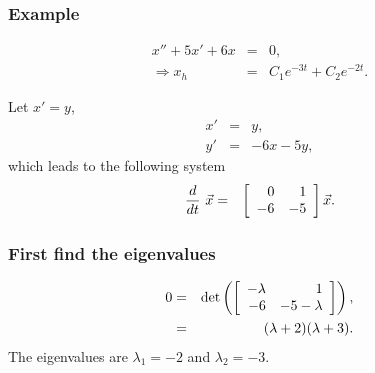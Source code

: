 \begin{frame}
  \frametitle{Example}

  \begin{eqnarray*}
    x'' + 5x' + 6x & = & 0, \\
    \Rightarrow x_h & = & C_1 e^{-3t} + C_2 e^{-2t}.
  \end{eqnarray*}

  {
    Let $x'=y$,
    \begin{eqnarray*}
      x' & = & y, \\
      y' & = & -6x - 5y,
    \end{eqnarray*}
    which leads to the following system
    \begin{eqnarray*}
      \deriv{~}{t} \vec{x} & = & \arrayTwo{0}{1}{-6}{-5} \vec{x}.
    \end{eqnarray*}
  }

\end{frame}

\begin{frame}
    \frametitle{First find the eigenvalues}
    \begin{eqnarray*}
      0 & = & \det\lp\arrayTwo{-\lambda}{1}{-6}{-5-\lambda}\rp, \\
      & = & (\lambda+2)(\lambda+3).
    \end{eqnarray*}
    The eigenvalues are $\lambda_1=-2$ and $\lambda_2=-3$.

\end{frame}

